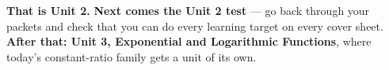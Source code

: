 \documentclass[10pt]{article}
\begin{document}
\vspace{0.10in}

\begin{remindbox}
\small
\textbf{That is Unit 2.} \textbf{Next comes the Unit 2 test} --- go back through your packets and
check that you can do every learning target on every cover sheet. \textbf{After that: Unit 3,
Exponential and Logarithmic Functions}, where today's constant-ratio family gets a unit of its own.
\end{remindbox}
\end{document}
